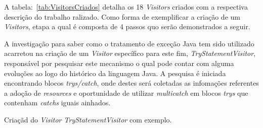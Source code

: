 A tabela:~\ref{tab:VisitorsCriados} detalha os 18 \textit{Visitors} criados com a respectiva descrição do trabalho ralizado. Como forma de exemplificar a criação de um \textit{Visitors}, etapa a qual é composta de 4 passos quo serão demonstrados a seguir.

A investigação para saber como o tratamento de exceção Java tem sido utilizado acarretou na criação de um \textit{Visitor} específico para este fim, \textit{TryStatementVisitor}, responsável por pesquisar este mecanismo o qual pode contar com alguma evoluções ao logo do histórico da linguagem Java. A pesquisa é iniciada encontrando blocos \textit{trys/catch}, onde destes será coletadas as infomações referentes a adoção de \textit{resources} e oportunidade de utilizar \textit{multicatch} em blocos \textit{trys} que contenham \textit{catchs} iguais ainhados.

Criaçãd do \textit{Visitor TryStatementVisitor} com exemplo.

